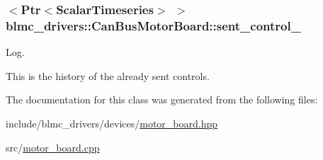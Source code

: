 \subsubsection[{\texorpdfstring{sent\+\_\+control\+\_\+}{sent_control_}}]{$<${\bf Ptr}$<${\bf Scalar\+Timeseries}$>$ $>$ blmc\+\_\+drivers\+::\+Can\+Bus\+Motor\+Board\+::sent\+\_\+control\+\_\+\hspace{0.3cm}{\ttfamily [private]}}\hypertarget{classblmc__drivers_1_1CanBusMotorBoard_ab5296d55684d48b538844c3b96df6594}{}\label{classblmc__drivers_1_1CanBusMotorBoard_ab5296d55684d48b538844c3b96df6594}


Log. 

This is the history of the already sent controls. 

The documentation for this class was generated from the following files\+:\begin{DoxyCompactItemize}
\item 
include/blmc\+\_\+drivers/devices/\hyperlink{motor__board_8hpp}{motor\+\_\+board.\+hpp}\item 
src/\hyperlink{motor__board_8cpp}{motor\+\_\+board.\+cpp}\end{DoxyCompactItemize}
